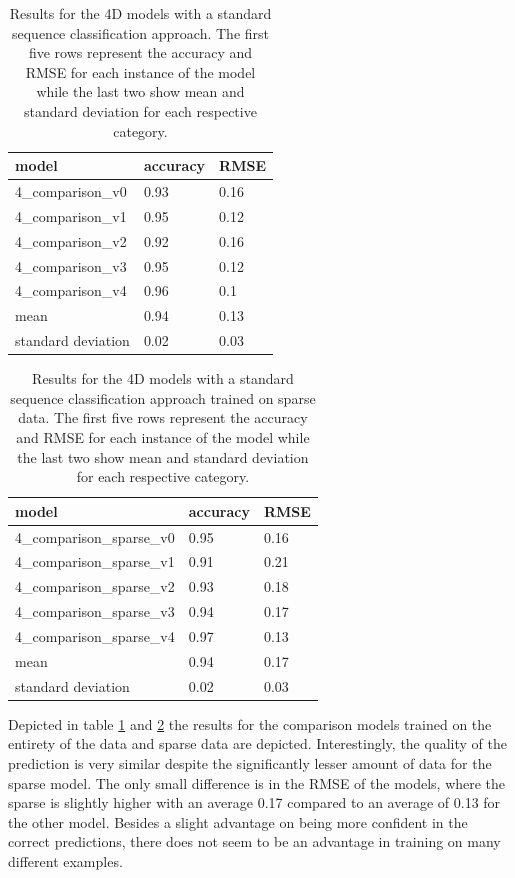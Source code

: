 \begin{table}[!htb]
	\centering
	\caption{Results for the 4D models with a standard sequence classification approach. The first five rows represent the accuracy and RMSE for each instance of the model while the last two show mean and standard deviation for each respective category.}
	\begin{tabularx}{\textwidth}{ X  X  X }
		\hline
		model & accuracy & RMSE \\ 
		\hline
		4\_comparison\_v0 & 0.93 & 0.16\\ 
		4\_comparison\_v1 & 0.95 & 0.12 \\
		4\_comparison\_v2 & 0.92 & 0.16 \\ 
		4\_comparison\_v3 & 0.95 & 0.12 \\ 
		4\_comparison\_v4 & 0.96 & 0.1  \\ \hline
		mean & 0.94 & 0.13\\
		standard deviation & 0.02 & 0.03\\
		\hline
	\end{tabularx}
	\label{table:4_comparison_mse}
\end{table}


\begin{table}[!htb]
	\centering
	\caption{Results for the 4D models with a standard sequence classification approach trained on sparse data. The first five rows represent the accuracy and RMSE for each instance of the model while the last two show mean and standard deviation for each respective category.}
	\begin{tabularx}{\textwidth}{ X  X  X }
		\hline
		model & accuracy & RMSE \\ 
		\hline
		4\_comparison\_sparse\_v0 & 0.95 & 0.16\\ 
		4\_comparison\_sparse\_v1 & 0.91 & 0.21 \\
		4\_comparison\_sparse\_v2 & 0.93 & 0.18 \\ 
		4\_comparison\_sparse\_v3 & 0.94 & 0.17 \\ 
		4\_comparison\_sparse\_v4 & 0.97 & 0.13 \\ \hline
		mean & 0.94 & 0.17\\
		standard deviation & 0.02 & 0.03\\
		\hline
	\end{tabularx}
	\label{table:4_comparison_sparse}
\end{table}

Depicted in table \ref{table:4_comparison_mse} and \ref{table:4_comparison_sparse} the results for the comparison models trained on the entirety of the data and sparse data are depicted. Interestingly, the quality of the prediction is very similar despite the significantly lesser amount of data for the sparse model. The only small difference is in the RMSE of the models, where the sparse is slightly higher with an average 0.17 compared to an average of 0.13 for the other model. Besides a slight advantage on being more confident in the correct predictions, there does not seem to be an advantage in training on many different examples. 

